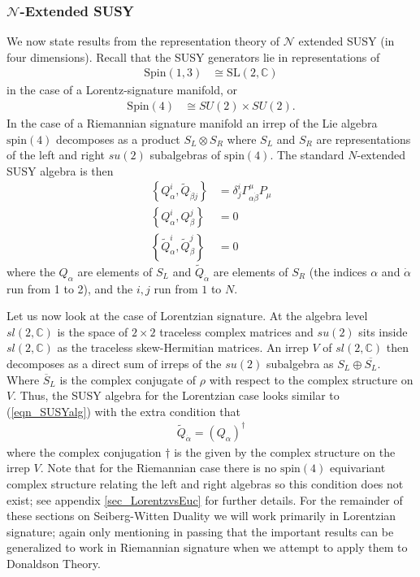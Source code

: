\documentclass[12pt, onecolumn]{article}
\begin{document}
\subsubsection{$\mathcal{N}$-Extended SUSY}
We now state results from the representation theory of $\mathcal{N}$ extended SUSY (in four dimensions).  Recall that the SUSY generators lie in representations of
\begin{align*}
\text{Spin}(1,3) & \cong \text{SL}(2,\mathbb{C})
\end{align*}
in the case of a Lorentz-signature manifold, or
\begin{align*}
\text{Spin}(4) & \cong SU(2) \times SU(2).
\end{align*}
In the case of a Riemannian signature manifold an irrep of the Lie algebra $\text{spin}(4)$ decomposes as a product $S_{L} \otimes S_{R}$ where $S_{L}$ and $S_{R}$ are representations of the left and right $su(2)$ subalgebras of $\text{spin}(4)$.  The standard $N$-extended SUSY algebra is then
\begin{align}
\left \{Q_{\alpha}^{i},\widetilde{Q}_{\dot{\beta}j} \right\}&=\delta^{i}_{j}\Gamma^{\mu}_{\alpha \dot{\beta}}P_{\mu} \label{eqn_SUSYalg}\\
\left \{Q_{\alpha}^{i},Q_{\beta}^{j} \right \}&=0 \nonumber \\
\left \{\widetilde{Q}_{\alpha}^{i},\widetilde{Q}_{\beta}^{j} \right \}&=0 \nonumber
\end{align}
where the $Q_{\alpha}$ are elements of $S_{L}$ and $\widetilde{Q}_{\dot{\alpha}}$ are elements of $S_{R}$ (the indices $\alpha$ and $\dot{\alpha}$ run from 1 to 2), and the $i,j$ run from $1$ to $N$.

\vspace{5mm}

\noindent Let us now look at the case of Lorentzian signature.  At the algebra level $sl(2,\mathbb{C})$ is the space of $2 \times 2$ traceless complex matrices and $su(2)$ sits inside $sl(2,\mathbb{C})$ as the traceless skew-Hermitian matrices.  An irrep $V$ of $sl(2,\mathbb{C})$ then decomposes as a direct sum of irreps of the $su(2)$ subalgebra as $S_{L} \oplus \overline{S_{L}}$.  Where $\overline{S}_{L}$ is the complex conjugate of $\rho$ with respect to the complex structure on $V$.  Thus, the SUSY algebra for the Lorentzian case looks similar to (\ref{eqn_SUSYalg}) with the extra condition that
\begin{align*}
\widetilde{Q}_{\dot{\alpha}}=(Q_{\alpha})^{\dagger}
\end{align*}
where the complex conjugation $\dagger$ is the given by the complex structure on the irrep $V$.  Note that for the Riemannian case there is no $\text{spin}(4)$ equivariant complex structure relating the left and right algebras so this condition does not exist; see appendix \ref{sec_LorentzvsEuc} for further details. For the remainder of these sections on Seiberg-Witten Duality we will work primarily in Lorentzian signature; again only mentioning in passing that the important results can be generalized to work in Riemannian signature when we attempt to apply them to Donaldson Theory.
\end{document}
